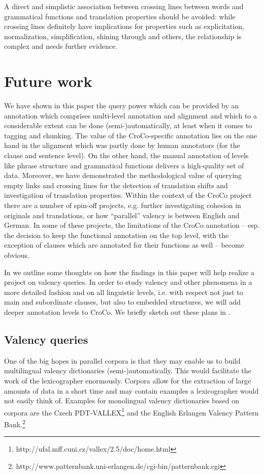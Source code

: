 \documentclass[output=paper]{LSP/langsci}
\begin{document}
A direct and simplistic association between crossing lines between words and grammatical functions and translation properties should be avoided: while crossing lines definitely have implications for properties such as explicitation, normalization, simplification, shining through and others, the relationship is complex and needs further evidence.


\section{Future work}\label{sec:culo:5}

We have shown in this paper the query power which can be provided by an annotation which comprises multi-level annotation and alignment and which to a considerable extent can be done (semi-)automatically, at least when it comes to tagging and chunking. The value of the CroCo-specific annotation lies on the one hand in the alignment which was partly done by human annotators (for the clause and sentence level). On the other hand, the manual annotation of levels like phrase structure and grammatical functions delivers a high-quality set of data. Moreover, we have demonstrated the methodological value of querying empty links and crossing lines for the detection of translation shifts and investigation of translation properties. Within the context of the CroCo project there are a number of spin-off projects, e.g. further investigating cohesion in originals and translations, or how ``parallel'' valency is between English and German. In some of these projects, the limitations of the CroCo annotation -- esp. the decision to keep the functional annotation on the top level, with the exception of clauses which are annotated for their functions as well -- become obvious.

In  we outline some thoughts on how the findings in this paper will help realize a project on valency queries. In order to study valency and other phenomena in a more detailed fashion and on all linguistic levels, i.e. with respect not just to main and subordinate clauses, but also to embedded structures, we will add deeper annotation levels to CroCo. We briefly sketch out these plans in .

\subsection{Valency queries}\label{sec:culo:5.1}

One of the big hopes in parallel corpora is that they may enable us to build multilingual valency dictionaries (semi-)automatically. This would facilitate the work of the lexicographer enormously. Corpora allow for the extraction of large amounts of data in a short time and may contain examples a lexicographer would not easily think of. Examples for monolingual valency dictionaries based on corpora are the Czech PDT-VALLEX\footnote{http://ufal.mff.cuni.cz/vallex/2.5/doc/home.html} and the English Erlangen Valency Pattern Bank.\footnote{http://www.patternbank.uni-erlangen.de/cgi-bin/patternbank.cgi}
\end{document}
